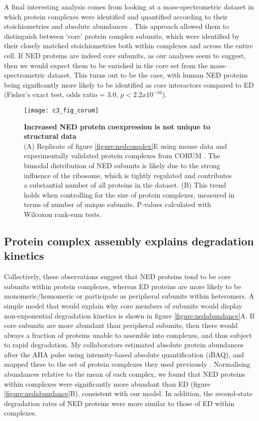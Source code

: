 \documentclass[a4paper,11pt,twoside,openright]{scrbook}
\begin{document}
A final interesting analysis comes from looking at a mass-spectrometric dataset in which protein complexes were identified and quantified according to their stoichiometries and absolute abundances \cite{Hein2015}. This approach allowed them to distinguish between `core' protein complex subunits, which were identified by their closely matched stoichiometries both within complexes and across the entire cell. If NED proteins are indeed core subunits, as our analyses seem to suggest, then we would expect them to be enriched in the core set from the mass-spectrometric dataset. This turns out to be the case, with human NED proteins being significantly more likely to be identified as core interactors compared to ED (Fisher's exact test, odds ratio = 3.0, $p < 2.2x10^{-16}$).

\begin{figure}
    \texttt{[image: c3\_fig\_corum]}
    \caption[Increased NED protein coexpression is not unique to structural data]{\sffamily \textbf{Increased NED protein coexpression is not unique to structural data} \\ \small (A) Replicate of figure \ref{figure:nedcomplex}E using mouse data and experimentally validated protein complexes from CORUM \cite{Ruepp2009}. The bimodal distribution of NED subunits is likely due to the strong influence of the ribosome, which is tightly regulated and contributes a substantial number of all proteins in the dataset. (B) This trend holds when controlling for the size of protein complexes, measured in terms of number of unique subunits. P-values calculated with Wilcoxon rank-sum tests.}
    \label{figure:corum}
\end{figure}

\subsection{Protein complex assembly explains degradation kinetics}
Collectively, these observations suggest that NED proteins tend to be core subunits within protein complexes, whereas ED proteins are more likely to be monomeric/homomeric or participate as peripheral subunits within heteromers. A simple model that would explain why core members of subunits would display non-exponential degradation kinetics is shown in figure \ref{figure:nedabundance}A. If core subunits are more abundant than peripheral subunits, then there would always a fraction of proteins unable to assemble into complexes, and thus subject to rapid degradation. My collaborators estimated absolute protein abundances after the AHA pulse using intensity-based absolute quantification \cite{Schwanhausser2011} (iBAQ), and mapped these to the set of protein complexes they used previously \cite{Ori2016}. Normalising abundances relative to the mean of each complex, we found that NED proteins within complexes were significantly more abundant than ED (figure \ref{figure:nedabundance}B), consistent with our model. In addition, the second-state degradation rates of NED proteins were more similar to those of ED within complexes.
\end{document}
